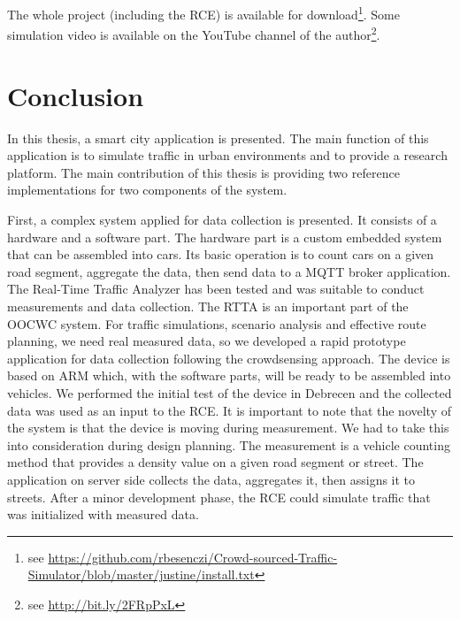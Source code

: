 \documentclass[b5paper,12pt]{report}
\theoremstyle{definition}
\begin{document}
The whole project (including the RCE) is available for download\footnote{see \url{https://github.com/rbesenczi/Crowd-sourced-Traffic-Simulator/blob/master/justine/install.txt}}. Some simulation video is available on the YouTube channel of the author\footnote{see \url{http://bit.ly/2FRpPxL}}.

\chapter{Conclusion}
\label{conclusion}

In this thesis, a smart city application is presented. The main function of this application is to simulate traffic in urban environments and to provide a research platform. The main contribution of this thesis is providing two reference implementations for two components of the system.

First, a complex system applied for data collection is presented. It consists of a hardware and a software part. The hardware part is a custom embedded system that can be assembled into cars. Its basic operation is to count cars on a given road segment, aggregate the data, then send data to a MQTT broker application. The Real-Time Traffic Analyzer has been tested and was suitable to conduct measurements and data collection. The RTTA is an important part of the OOCWC system. For traffic simulations, scenario analysis and effective route planning, we need real measured data, so we developed a rapid prototype application for data collection following the crowdsensing approach. The device is based on ARM which, with the software parts, will be ready to be assembled into vehicles. We performed the initial test of the device in Debrecen and the collected data was used as an input to the RCE. It is important to note that the novelty of the system is that the device is moving during measurement. We had to take this into consideration during design planning. The measurement is a vehicle counting method that provides a density value on a given road segment or street. The application on server side collects the data, aggregates it, then assigns it to streets. After a minor development phase, the RCE could simulate traffic that was initialized with measured data.
\end{document}
